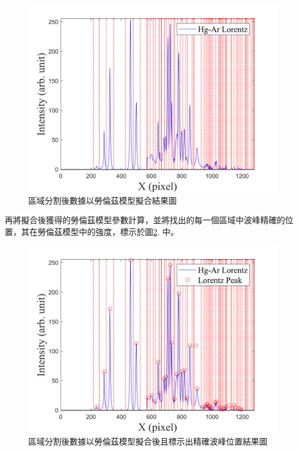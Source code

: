 \begin{figure}[H] %
	\centering %
	\includegraphics[width=14.5cm]{figures/comebine_hg_ar_lorent.png} %
	\caption{區域分割後數據以勞倫茲模型擬合結果圖} %
	\label{區域分割後數據以勞倫茲模型擬合結果圖} %
\end{figure}
再將擬合後獲得的勞倫茲模型參數計算，並將找出的每一個區域中波峰精確的位置，其在勞倫茲模型中的強度，標示於圖\ref{區域分割後數據以勞倫茲模型擬合後且標示出精確波峰位置結果圖}. 中。
\begin{figure}[H] %
	\centering %
	\vspace{0.8cm}
	\includegraphics[width=15cm]{figures/comebine_hg_ar_lorent_with_peak.png} %
	\caption{區域分割後數據以勞倫茲模型擬合後且標示出精確波峰位置結果圖} %
	\label{區域分割後數據以勞倫茲模型擬合後且標示出精確波峰位置結果圖} %
\end{figure}
